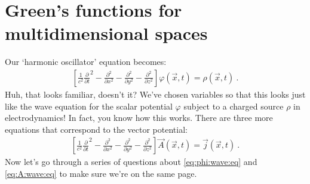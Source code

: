 \section{Green's functions for multidimensional spaces}
Our `harmonic oscillator' equation becomes:
\begin{align}
  \left[\frac{1}{c^2}
      \frac{\partial}{\partial t}^2
      -
      \frac{\partial^2}
      {\partial x^2}
      -
      \frac{\partial^2}
      {\partial y^2}
      -
      \frac{\partial^2}
      {\partial z^2}
    \right]
    \varphi(\vec{x},t) = \rho(\vec{x},t) \ .
    \label{eq:phi:wave:eq}
\end{align}
Huh, that looks familiar, doesn't it? We've chosen variables so that this looks just like the wave equation for the scalar potential $\varphi$ subject to a charged source $\rho$ in electrodynamics! In fact, you know how this works. There are three more equations that correspond to the vector potential:
\begin{align}
  \left[\frac{1}{c^2}
      \frac{\partial}{\partial t}^2
      -
      \frac{\partial^2}
      {\partial x^2}
      -
      \frac{\partial^2}
      {\partial y^2}
      -
      \frac{\partial^2}
      {\partial z^2}
    \right]
    \vec A(\vec{x},t) = \vec j(\vec{x},t) \ .
    \label{eq:A:wave:eq}
\end{align}
Now let's go through a series of questions about \eqref{eq:phi:wave:eq} and \eqref{eq:A:wave:eq} to make sure we're on the same page. 
